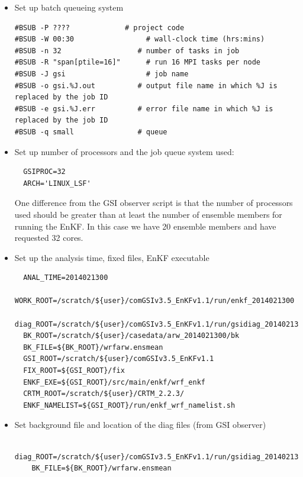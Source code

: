\begin{itemize}
\item Set up batch queueing system
\begin{footnotesize}
\begin{verbatim}
#BSUB -P ????             # project code
#BSUB -W 00:30                 # wall-clock time (hrs:mins)
#BSUB -n 32                  # number of tasks in job         
#BSUB -R "span[ptile=16]"      # run 16 MPI tasks per node
#BSUB -J gsi                   # job name
#BSUB -o gsi.%J.out          # output file name in which %J is replaced by the job ID
#BSUB -e gsi.%J.err          # error file name in which %J is replaced by the job ID
#BSUB -q small               # queue
\end{verbatim}
\end{footnotesize}

\item Set up number of processors and the job queue system used:
\begin{footnotesize}
\begin{verbatim}
  GSIPROC=32
  ARCH='LINUX_LSF'
\end{verbatim}
\end{footnotesize}
One difference from the GSI observer script is that the number of processors used should be greater than at least the number of ensemble members for running the EnKF. In this case we have 20 ensemble members and have requested 32 cores.\\

\item Set up the analysis time, fixed files, EnKF executable
\begin{footnotesize}
\begin{verbatim}
  ANAL_TIME=2014021300
  WORK_ROOT=/scratch/${user}/comGSIv3.5_EnKFv1.1/run/enkf_2014021300
  diag_ROOT=/scratch/${user}/comGSIv3.5_EnKFv1.1/run/gsidiag_2014021300
  BK_ROOT=/scratch/${user}/casedata/arw_2014021300/bk
  BK_FILE=${BK_ROOT}/wrfarw.ensmean
  GSI_ROOT=/scratch/${user}/comGSIv3.5_EnKFv1.1
  FIX_ROOT=${GSI_ROOT}/fix
  ENKF_EXE=${GSI_ROOT}/src/main/enkf/wrf_enkf
  CRTM_ROOT=/scratch/${user}/CRTM_2.2.3/
  ENKF_NAMELIST=${GSI_ROOT}/run/enkf_wrf_namelist.sh
\end{verbatim}
\end{footnotesize}

\item Set background file and location of the diag files (from GSI observer)

\begin{footnotesize}
\begin{verbatim}
    diag_ROOT=/scratch/${user}/comGSIv3.5_EnKFv1.1/run/gsidiag_2014021300
    BK_FILE=${BK_ROOT}/wrfarw.ensmean
\end{verbatim}
\end{footnotesize}


\end{itemize}
